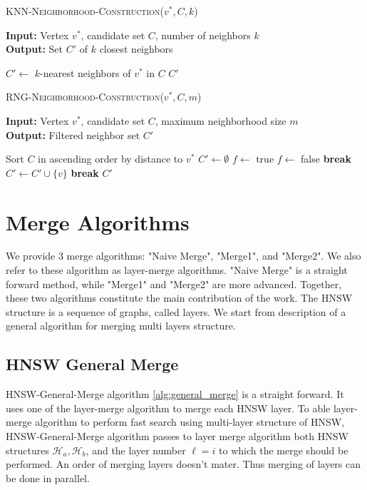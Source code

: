 \documentclass{article}
\begin{document}
\begin{algorithm}
\caption{\textsc{KNN-Neighborhood-Construction}($v^*, C, k$)}\label{alg:knntrategy}
\textbf{Input:} Vertex $v^*$, candidate set $C$, number of neighbors $k$ \\
\textbf{Output:} Set $C'$ of $k$ closest neighbors
\begin{algorithmic}[1]
\State $C' \gets$ $k$-nearest neighbors of $v^*$ in $C$
\State \Return $C'$
\end{algorithmic}
\end{algorithm}

\begin{algorithm}
\caption{\textsc{RNG-Neighborhood-Construction}($v^*, C, m$)}\label{alg:rngstrategy}
\textbf{Input:} Vertex $v^*$, candidate set $C$, maximum neighborhood size $m$ \\
\textbf{Output:} Filtered neighbor set $C'$
\begin{algorithmic}[1]
\State Sort $C$ in ascending order by distance to $v^*$
\State $C' \gets \emptyset$
    \State $f \gets$ true
            \State $f \gets$ false
            \State \textbf{break}
        \EndIf
    \EndFor
        \State $C' \gets C' \cup \{v\}$
    \EndIf
        \State \textbf{break}
    \EndIf
\EndFor
\State \Return $C'$
\end{algorithmic}
\end{algorithm}

\section{Merge Algorithms}

We provide 3 merge algorithms: "Naive Merge", "Merge1", and "Merge2". We also refer to these algorithm as layer-merge algorithms. "Naive Merge" is a straight forward method, while "Merge1" and "Merge2" are more advanced. Together, these two algorithms constitute the main contribution of the work. The HNSW structure is a sequence of graphs, called layers. We start from description of a general algorithm for merging multi layers structure.

\subsection{HNSW General Merge}

HNSW-General-Merge algorithm \ref{alg:general_merge} is a straight forward. It uses one of the layer-merge algorithm to merge each HNSW layer. To able layer-merge algorithm to perform fast search using multi-layer structure of HNSW, HNSW-General-Merge algorithm passes to layer merge algorithm both HNSW structures $\mathcal{H}_a, \mathcal{H}_b$, and the layer number $\ell=i$ to which the merge should be performed. An order of merging layers doesn't mater. Thus merging of layers can be done in parallel.
\end{document}
